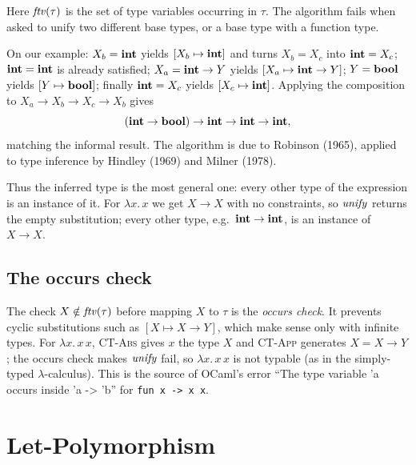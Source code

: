 
Here $\mathit{ftv}(\tau)$ is the set of type variables occurring in $\tau$. The algorithm
fails when asked to unify two different base types, or a base type with a function
type.

On our example: $X_b = \mathbf{int}$ yields $[X_b \mapsto \mathbf{int}]$ and turns
$X_b = X_c$ into $\mathbf{int} = X_c$; $\mathbf{int} = \mathbf{int}$ is already satisfied;
$X_a = \mathbf{int} \to Y$ yields $[X_a \mapsto \mathbf{int} \to Y]$; $Y = \mathbf{bool}$ yields
$[Y \mapsto \mathbf{bool}]$; finally $\mathbf{int} = X_c$ yields $[X_c \mapsto \mathbf{int}]$.
Applying the composition to $X_a \to X_b \to X_c \to X_b$ gives
\[
(\mathbf{int} \to \mathbf{bool}) \to \mathbf{int} \to \mathbf{int} \to \mathbf{int},
\]
matching the informal result. The algorithm is due to Robinson (1965), applied to type
inference by Hindley (1969) and Milner (1978).


Thus the inferred type is the most general one: every other type of the expression is
an instance of it. For $\lambda x.\, x$ we get $X \to X$ with no constraints, so
$\mathit{unify}$ returns the empty substitution; every other type, e.g.\ $\mathbf{int} \to
\mathbf{int}$, is an instance of $X \to X$.

\subsection{The occurs check}

The check $X \notin \mathit{ftv}(\tau)$ before mapping $X$ to $\tau$ is the \emph{occurs
check}. It prevents cyclic substitutions such as $[X \mapsto X \to Y]$, which make
sense only with infinite types. For $\lambda x.\, x\,x$, \textsc{CT-Abs} gives $x$ the
type $X$ and \textsc{CT-App} generates $X = X \to Y$; the occurs check makes
$\mathit{unify}$ fail, so $\lambda x.\, x\,x$ is not typable (as in the simply-typed
$\lambda$-calculus). This is the source of OCaml's error ``The type variable 'a
occurs inside 'a -> 'b'' for \texttt{fun x -> x x}.

\section{Let-Polymorphism}

